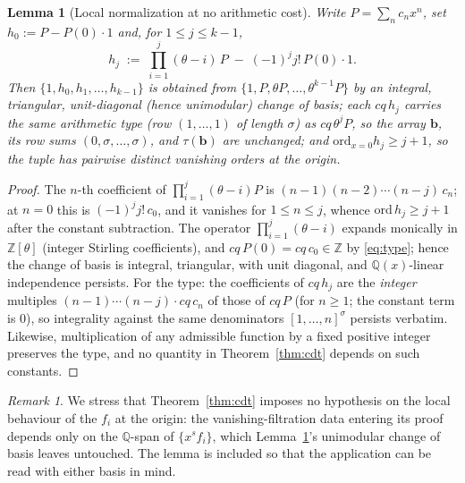 \documentclass[11pt]{amsart}
\newtheorem{lemma}[theorem]{Lemma}
\theoremstyle{definition}
\theoremstyle{remark}
\newtheorem{remark}[theorem]{Remark}
\newcommand{\Q}{\mathbb{Q}}
\newcommand{\Z}{\mathbb{Z}}
\newcommand{\lcm}[1]{[1,\dots,#1]}
\begin{document}
\begin{lemma}[Local normalization at no arithmetic cost]\label{lem:val}
Write $P=\sum_n c_nx^n$, set $h_0:=P-P(0)\cdot 1$ and, for
$1\le j\le k-1$,
\[
h_j\;:=\;\prod_{i=1}^{j}(\theta-i)\,P\;-\;(-1)^j j!\,P(0)\cdot 1 .
\]
Then $\{1,h_0,h_1,\dots,h_{k-1}\}$ is obtained from
$\{1,P,\theta P,\dots,\theta^{k-1}P\}$ by an integral, triangular,
unit-diagonal (hence unimodular) change of basis; each $cq\,h_j$
carries the same arithmetic type (row $(1,\dots,1)$ of length
$\sigma$) as $cq\,\theta^jP$, so the array $\mathbf b$, its row sums
$(0,\sigma,\dots,\sigma)$, and $\tau(\mathbf b)$ are unchanged; and
$\mathrm{ord}_{x=0}h_j\ge j+1$, so the tuple has pairwise distinct
vanishing orders at the origin.
\end{lemma}

\begin{proof}
The $n$-th coefficient of $\prod_{i=1}^{j}(\theta-i)P$ is
$(n-1)(n-2)\cdots(n-j)\,c_n$; at $n=0$ this is $(-1)^jj!\,c_0$, and it
vanishes for $1\le n\le j$, whence $\mathrm{ord}\,h_j\ge j+1$ after the
constant subtraction. The operator $\prod_{i=1}^{j}(\theta-i)$ expands
monically in $\Z[\theta]$ (integer Stirling coefficients), and
$cq\,P(0)=cq\,c_0\in\Z$ by \eqref{eq:type}; hence the change of basis
is integral, triangular, with unit diagonal, and $\Q(x)$-linear
independence persists. For the type: the coefficients of $cq\,h_j$ are
the \emph{integer} multiples $(n-1)\cdots(n-j)\cdot cq\,c_n$ of those
of $cq\,P$ (for $n\ge1$; the constant term is $0$), so integrality
against the same denominators $\lcm{n}^{\sigma}$ persists verbatim.
Likewise, multiplication of any admissible function by a fixed positive
integer preserves the type, and no quantity in Theorem~\ref{thm:cdt}
depends on such constants.
\end{proof}

\begin{remark}
We stress that Theorem~\ref{thm:cdt} imposes no hypothesis on the
local behaviour of the $f_i$ at the origin: the vanishing-filtration
data entering its proof depends only on the $\Q$-span of
$\{x^sf_i\}$, which Lemma~\ref{lem:val}'s unimodular change of basis
leaves untouched. The lemma is included so that the application can be
read with either basis in mind.
\end{remark}
\end{document}
